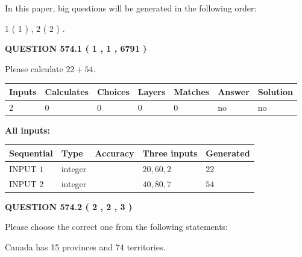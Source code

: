 \documentclass[12pt]{article}
\begin{document}
In this paper, big questions will be generated in the following order: 
   
   
   1 ( 1 )
 ,
   2 ( 2 )
 .
  
\vspace{0.2in}
  
{\textbf{\Large{QUESTION
574.1 
 ( 1 , 1 , 6791 )
}}}
  
  
 
Please calculate $ %
22 +  %
54 $.
 
 
   
   
   
   
\noindent\begin{tabular}{|l|l|l|l|l|l|l|}
 \hline
Inputs & Calculates & Choices & Layers & Matches & Answer & Solution \\ \hline
 2  & 
 0  & 
 0
  & 
 0  & 
 0  & 
  no & 
  no 
  \\ \hline
 \end{tabular}
   
   
   
   
\noindent{}
   
   
   
   
\noindent\vspace{0.1in}\hspace{-0.08in} {\textbf{\Large{All inputs: }}}
   
   
  
  
\noindent\begin{tabular}{|l|l|l|l|l|}
\hline
 Sequential & Type & Accuracy & Three inputs & Generated \\ 
\hline
 
 
  INPUT $  1 $ & integer &  & $
 20
 , 
 60
 , 
 2
 $ & $ 22 $ 
 \\  \hline  
 
 
  INPUT $  2 $ & integer &  & $
 40
 , 
 80
 , 
 7
 $ & $ 54 $ 
 \\  \hline  
 \end{tabular}
   
   
  
\vspace{0.2in}
  
{\textbf{\Large{QUESTION
574.2 
 ( 2 , 2 , 3 )
}}}
  
  
Please choose the correct one from the following statements:
 
 
Canada has  15 provinces and  74 territories.
 
\end{document}
